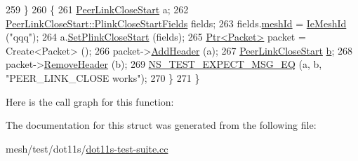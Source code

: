\begin{DoxyCode}
259   \}
260   \{
261     \hyperlink{classns3_1_1dot11s_1_1PeerLinkCloseStart}{PeerLinkCloseStart} a;
262     \hyperlink{structns3_1_1dot11s_1_1PeerLinkCloseStart_1_1PlinkCloseStartFields}{PeerLinkCloseStart::PlinkCloseStartFields} fields;
263     fields.\hyperlink{structns3_1_1dot11s_1_1PeerLinkCloseStart_1_1PlinkCloseStartFields_a3ab466662b52bcfa68ee148321b9625b}{meshId} = \hyperlink{classns3_1_1dot11s_1_1IeMeshId}{IeMeshId} (\textcolor{stringliteral}{"qqq"});
264     a.\hyperlink{classns3_1_1dot11s_1_1PeerLinkCloseStart_aba1cca0da9169bc5fd483c11f246e01f}{SetPlinkCloseStart} (fields);
265     \hyperlink{classns3_1_1Ptr}{Ptr<Packet>} packet = Create<Packet> ();
266     packet->\hyperlink{classns3_1_1Packet_a465108c595a0bc592095cbcab1832ed8}{AddHeader} (a);
267     \hyperlink{classns3_1_1dot11s_1_1PeerLinkCloseStart}{PeerLinkCloseStart} \hyperlink{buildings__pathloss_8m_a21ad0bd836b90d08f4cf640b4c298e7c}{b};
268     packet->\hyperlink{classns3_1_1Packet_a0961eccf975d75f902d40956c93ba63e}{RemoveHeader} (b);
269     \hyperlink{group__testing_ga7304ba46a28d8cf08dfdfd6499cf7068}{NS\_TEST\_EXPECT\_MSG\_EQ} (a, b, \textcolor{stringliteral}{"PEER\_LINK\_CLOSE works"});
270   \}
271 \}
\end{DoxyCode}


Here is the call graph for this function\+:




The documentation for this struct was generated from the following file\+:\begin{DoxyCompactItemize}
\item 
mesh/test/dot11s/\hyperlink{dot11s-test-suite_8cc}{dot11s-\/test-\/suite.\+cc}\end{DoxyCompactItemize}
